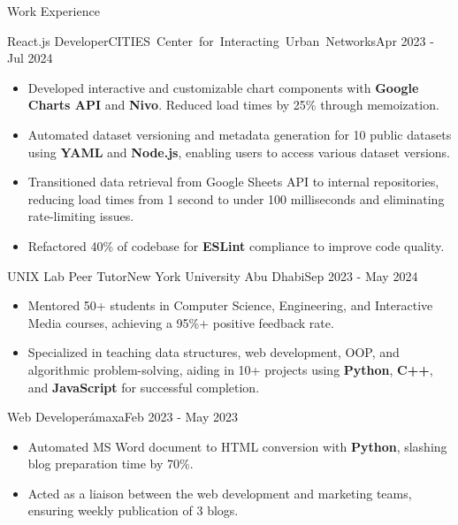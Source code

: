 \documentclass[]{mcdowellcv}
\begin{document}
	\begin{cvsection}{Work Experience}
		\begin{cvsubsection}{React.js Developer}{\mbox{\hspace{-1.2cm}CITIES Center for Interacting Urban Networks}}{Apr 2023 - Jul 2024}			
			\begin{itemize}
				\item Developed interactive and customizable chart components with \textbf{Google Charts API} and \textbf{Nivo}. Reduced load times by 25\% through memoization.
				\item Automated dataset versioning and metadata generation for 10 public datasets using \textbf{YAML} and \textbf{Node.js}, enabling users to access various dataset versions.
				\item Transitioned data retrieval from Google Sheets API to internal repositories, reducing load times from 1 second to under 100 milliseconds and eliminating rate-limiting issues.
				\item Refactored 40\% of codebase for \textbf{ESLint} compliance to improve code quality.
			\end{itemize}
		\end{cvsubsection}
		
		\vspace{-0.1cm}
		
		\begin{cvsubsection}{UNIX Lab Peer Tutor}{New York University Abu Dhabi}{Sep 2023 - May 2024}			
			\begin{itemize}
				\item Mentored 50+ students in Computer Science, Engineering, and Interactive Media courses, achieving a 95\%+ positive feedback rate.
				\item Specialized in teaching data structures, web development, OOP, and algorithmic problem-solving, aiding in 10+ projects using \textbf{Python}, \textbf{C++}, and \textbf{JavaScript} for successful completion.
			\end{itemize}
		\end{cvsubsection}
		
		\vspace{-0.1cm}
		
	\begin{cvsubsection}{Web Developer}{ámaxa}{Feb 2023 - May 2023}			
			\begin{itemize}
				\item Automated MS Word document to HTML conversion with \textbf{Python}, slashing blog preparation time by 70\%.
				\item Acted as a liaison between the web development and marketing teams, ensuring weekly publication of 3 blogs.
			\end{itemize}
		\end{cvsubsection}
	\end{cvsection}
	
\end{document}

